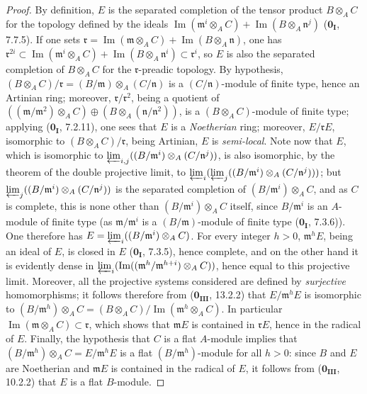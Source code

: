 \begin{proof}
By definition, $E$ is the separated completion of the tensor product $B\otimes_A C$ for the topology defined by the ideals $\operatorname{Im}(\mathfrak{m}^i\otimes_A C)+\operatorname{Im}(B\otimes_A \mathfrak{n}^j)$ ($\mathbf{0_I}$, 7.7.5).
If one sets $\mathfrak{r}=\operatorname{Im}(\mathfrak{m}\otimes_A C)+\operatorname{Im}(B\otimes_A \mathfrak{n})$, one has $\mathfrak{r}^{2i}\subset\operatorname{Im}(\mathfrak{m}^i\otimes_A C)+\operatorname{Im}(B\otimes_A \mathfrak{n}^i)\subset\mathfrak{r}^i$, so $E$ is also the separated completion of $B\otimes_A C$ for the $\mathfrak{r}$-preadic topology.
By hypothesis, $(B\otimes_A C)/\mathfrak{r}=(B/\mathfrak{m})\otimes_A (C/\mathfrak n)$ is a $(C/\mathfrak{n})$-module of finite type, hence an Artinian ring;
moreover, $\mathfrak{r}/\mathfrak{r}^2$, being a quotient of $((\mathfrak{m}/\mathfrak{m}^2)\otimes_A C)\oplus(B\otimes_A (\mathfrak{n}/\mathfrak{n}^2))$, is a $(B\otimes_A C)$-module of finite type; applying ($\mathbf{0_I}$, 7.2.11), one sees that $E$ is a \emph{Noetherian} ring; moreover, $E/\mathfrak{r}E$, isomorphic to $(B\otimes_A C)/\mathfrak{r}$, being Artinian, $E$ is \emph{semi-local}.
Note now that $E$, which is isomorphic to $\varprojlim_{i,j}((B/\mathfrak{m}^i)\otimes_A(C/\mathfrak{n}^j))$, is also isomorphic, by the theorem of the double projective limit, to $\varprojlim_i(\varprojlim_j((B/\mathfrak{m}^i)\otimes_A (C/\mathfrak{n}^j)))$; but $\varprojlim_j((B/\mathfrak{m}^i)\otimes_A (C/\mathfrak{n}^j))$
is the separated completion of $(B/\mathfrak{m}^i)\otimes_A C$, and as $C$ is complete, this is none other than $(B/\mathfrak{m}^i)\otimes_A C$ itself, since $B/\mathfrak{m}^i$ is an $A$-module of finite type (as $\mathfrak{m}/\mathfrak{m}^i$ is a $(B/\mathfrak{m})$-module of finite type ($\mathbf{0_I}$, 7.3.6)).
One therefore has $E=\varprojlim_i((B/\mathfrak{m}^i)\otimes_A C)$.
For every integer $h>0$, $\mathfrak{m}^h E$, being an ideal of $E$, is closed in $E$ ($\mathbf{0_I}$, 7.3.5), hence complete, and on the other hand it is evidently dense in $\varprojlim_i(\operatorname{Im}((\mathfrak{m}^h/\mathfrak{m}^{h+i})\otimes_A C))$, hence equal to this projective limit.
Moreover, all the projective systems considered are defined by \emph{surjective} homomorphisms; it follows therefore from ($\mathbf{0_{III}}$, 13.2.2) that $E/\mathfrak{m}^h E$ is isomorphic to $(B/\mathfrak{m}^h)\otimes_A C = (B\otimes_A C)/\operatorname{Im}(\mathfrak{m}^h\otimes_A C)$.
In particular $\operatorname{Im}(\mathfrak{m}\otimes_A C)\subset\mathfrak{r}$, which shows that $\mathfrak{m}E$ is contained in $\mathfrak{r}E$, hence in the radical of $E$.
Finally, the hypothesis that $C$ is a flat $A$-module implies that $(B/\mathfrak{m}^h)\otimes_A C = E/\mathfrak{m}^h E$ is a flat $(B/\mathfrak{m}^h)$-module for all $h>0$: since $B$ and $E$ are Noetherian and $\mathfrak{m}E$ is contained in the radical of $E$, it follows from ($\mathbf{0_{III}}$, 10.2.2) that $E$ is a flat $B$-module.
\end{proof}

